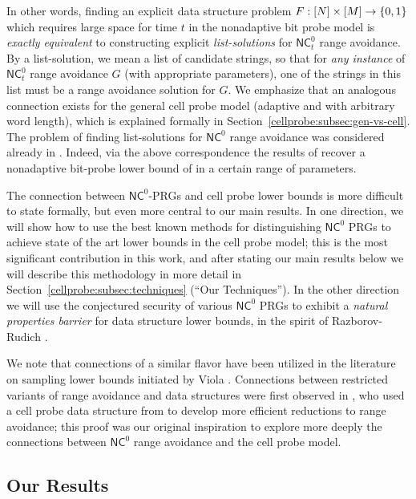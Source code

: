 In other words, finding an explicit data structure problem $F:[N] \times [M] \to \{0,1\}$ which requires large space for time $t$ in the nonadaptive bit probe model is \emph{exactly equivalent} to constructing explicit \emph{list-solutions} for $\mathsf{NC}^0_t$ range avoidance. By a list-solution, we mean a list of candidate strings, so that for \emph{any instance} of $\mathsf{NC}^0_t$ range avoidance $G$ (with appropriate parameters), one of the strings in this list must be a range avoidance solution for $G$. 
We emphasize that an analogous connection exists for the general cell probe model (adaptive and with arbitrary word length), which is explained formally in Section~\ref{cellprobe:subsec:gen-vs-cell}.
The problem of finding list-solutions for $\mathsf{NC}^0$ range avoidance was considered already in \cite{guruswami2022range}. Indeed, via the above correspondence the results of \cite{guruswami2022range} recover a nonadaptive bit-probe lower bound of \cite{golovnev} in a certain range of parameters.

The connection between $\mathsf{NC}^0$-PRGs and cell probe lower bounds is more difficult to state formally, but even more central to our main results. In one direction, we will show how to use the best known methods for distinguishing $\mathsf{NC}^0$ PRGs to achieve state of the art lower bounds in the cell probe model; this is the most significant contribution in this work, and after stating our main results below we will describe this methodology in more detail in Section~\ref{cellprobe:subsec:techniques} (``Our Techniques'').
In the other direction we will use the conjectured security of various $\mathsf{NC}^0$ PRGs to exhibit a \emph{natural properties barrier} for data structure lower bounds, in the spirit of Razborov-Rudich \cite{natural-proofs}.

We note that connections of a similar flavor have been utilized in the literature on sampling lower bounds initiated by Viola \cite{viola-sampling}. Connections between restricted variants of range avoidance and data structures were first observed in \cite{guruswami2022range}, who used a cell probe data structure from \cite{succincter} to develop more efficient reductions to range avoidance; this proof was our original inspiration to explore more deeply the connections between $\mathsf{NC}^0$ range avoidance and the cell probe model.

\subsection{Our Results}

